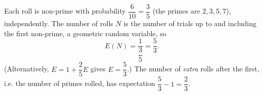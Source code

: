 Each roll is non-prime with probability $\dfrac{6}{10}=\dfrac35$ (the primes are $2,3,5,7$), independently. The number of rolls $N$ is the number of trials up to and including the first non-prime, a geometric random variable, so
\[E(N)=\dfrac{1}{\dfrac35}=\boxed{\dfrac53}.\]
(Alternatively, $E=1+\dfrac25E$ gives $E=\dfrac53$.) The number of \emph{extra} rolls after the first, i.e. the number of primes rolled, has expectation $\dfrac53-1=\dfrac23$.
